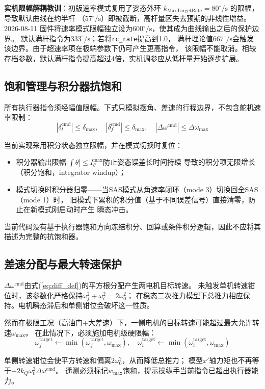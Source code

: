 \textbf{实机限幅解耦教训}：初版速率模式复用了姿态外环
$k_{\text{MaxTargetRate}}=80^\circ/\mathrm{s}$ 的限幅，导致默认曲线在约半杆
（$57^\circ/\mathrm{s}$）即被截断，高杆量区失去预期的非线性增益。2026-08-11
固件将速率模式限幅独立设为$600^\circ/\mathrm{s}$，使其成为曲线输出之后的保护边界。
默认满杆指令为$333^\circ/\mathrm{s}$；若将\texttt{rc\_rate}提高到1.0，
满杆理论值$667^\circ/\mathrm{s}$会触发该边界。由于超速率项在极端参数下仍可产生更高指令，
该限幅不能取消。相较存档参数，默认满杆指令提高超过4倍，实机调参应从低杆量开始逐步扩展。

\subsection{饱和管理与积分器抗饱和}

所有执行器指令须经幅值限幅。下式只模拟摆角、差速的行程边界，不包含舵机速率限制：
\begin{equation}
    |\delta_t^{\text{cmd}}| \leq \delta_{\max}, \quad
    |\delta_f^{\text{cmd}}| \leq \delta_{\max}, \quad
    |\Delta\omega^{\text{cmd}}| \leq \Delta\omega_{\max}
    \label{eq:actuator_limits}
\end{equation}

当前实现采用积分状态独立限幅，并在模式切换时复位：
\begin{itemize}
    \item 积分器输出限幅$|\int \theta| \leq I_\theta^{\max}$防止姿态误差长时间持续
          导致的积分项无限增长（积分饱和，integrator windup）；
    \item 模式切换时积分器归零——当SAS模式从角速率闭环（mode 3）切换回全SAS（mode 1）时，
          旧模式下累积的积分值（基于不同误差信号）直接清零，防止在新模式刚启动时产生
          瞬态冲击。
\end{itemize}
当前代码没有基于执行器饱和方向冻结积分、回算或条件积分逻辑，因此不应将其描述为完整的抗饱和器。

\subsection{差速分配与最大转速保护}

$\Delta\omega^{\text{cmd}}$由式(\ref{eq:diff_def})的平方根分配产生两电机目标转速。
未触发单机转速钳位时，该参数化严格保持$\omega_f^2+\omega_t^2=2\omega_0^2$；
在稳态二次推力模型下总推力相应保持。电机瞬态滞后和单侧钳位会破坏这一性质。

然而在极限工况（高油门+大差速）下，一侧电机的目标转速可能超过最大允许转速$\omega_{\max}$。
在此情况下，必须施加电机级硬限幅：
\begin{equation}
    \omega_f^{\text{target}} \leftarrow \min(\omega_f^{\text{target}}, \omega_{\max}), \quad
    \omega_t^{\text{target}} \leftarrow \min(\omega_t^{\text{target}}, \omega_{\max})
    \label{eq:max_clamp}
\end{equation}

单侧转速钳位会使平方转速和偏离$2\omega_0^2$，从而降低总推力；
模型$x'$轴力矩也不再等于$-2k_Q\omega_0^2\Delta\omega^{\text{cmd}}$。
遥测必须标记$w_{\max}$饱和，提示操纵手当前指令已超出执行器能力。
